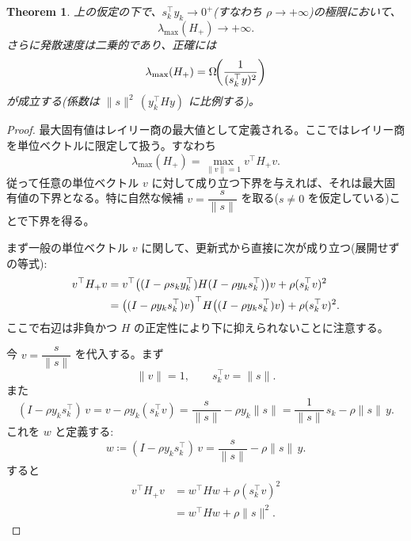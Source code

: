 \documentclass[a4paper, 10pt, dvipdfmx,draft]{article}
\newcommand{\defeq}{\coloneqq}
\newtheorem{theorem}{Theorem}
\begin{document}
\begin{theorem}
    上の仮定の下で、\(s_k^\top y_k \to 0^+\)(すなわち \(\rho\to +\infty\))の極限において、
    \[
        \lambda_{\max}(H_{+}) \to +\infty.
    \]
    さらに発散速度は二乗的であり、正確には
    \[
        \lambda_{\max}(H_{+}) = \Omega\!\qty(\frac{1}{(s_k^\top y)^2})
    \]
    が成立する(係数は \(\|s\|^2\, (y_k^\top H y)\) に比例する)。
\end{theorem}

\begin{proof}
    最大固有値はレイリー商の最大値として定義される。ここではレイリー商を単位ベクトルに限定して扱う。すなわち
    \[
        \lambda_{\max}(H_{+}) = \max_{\|v\|=1} v^\top H_{+} v.
    \]
    従って任意の単位ベクトル \(v\) に対して成り立つ下界を与えれば、それは最大固有値の下界となる。特に自然な候補 \(v=\dfrac{s}{\|s\|}\) を取る(\(s\neq0\) を仮定している)ことで下界を得る。

    まず一般の単位ベクトル \(v\) に関して、更新式から直接に次が成り立つ(展開せずの等式):
    \[
        \begin{aligned}
            v^\top H_{+} v
             & = v^\top \qty((I-\rho s_k y_k^\top) H (I-\rho y_k s_k^\top)) v + \rho (s_k^\top v)^2        \\
             & = \qty((I-\rho y_k s_k^\top) v)^\top H \qty((I-\rho y_k s_k^\top) v) + \rho (s_k^\top v)^2.
        \end{aligned}
    \]
    ここで右辺は非負かつ \(H\) の正定性により下に抑えられないことに注意する。

    今 \(v=\dfrac{s}{\|s\|}\) を代入する。まず
    \[
        \|v\|=1,\qquad s_k^\top v = \|s\|.
    \]
    また
    \[
        (I-\rho y_k s_k^\top)\,v = v - \rho y_k (s_k^\top v) = \frac{s}{\|s\|} - \rho y_k \|s\|
        = \frac{1}{\|s\|}\,s_k - \rho \|s\|\, y.
    \]
    これを \(w\) と定義する:
    \[
        w  \defeq  (I-\rho y_k s_k^\top)\,v = \frac{s}{\|s\|} - \rho \|s\|\, y.
    \]
    すると
    \[
        \begin{aligned}
            v^\top H_{+} v
             & = w^\top H w + \rho (s_k^\top v)^2 \\
             & = w^\top H w + \rho \|s\|^2.
        \end{aligned}
    \]


\end{proof}
\end{document}
